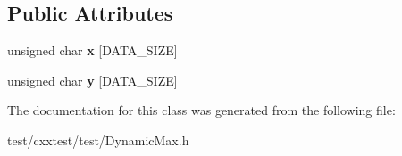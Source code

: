 \subsection*{Public Attributes}
\begin{DoxyCompactItemize}
\item 
\hypertarget{classSetUpAffectsAllTests_a405ae1454acd0d4cae2cfa45501907e9}{unsigned char {\bfseries x} \mbox{[}D\-A\-T\-A\-\_\-\-S\-I\-Z\-E\mbox{]}}\label{classSetUpAffectsAllTests_a405ae1454acd0d4cae2cfa45501907e9}

\item 
\hypertarget{classSetUpAffectsAllTests_a9ab7eb68a0cb11489c386573010b78ea}{unsigned char {\bfseries y} \mbox{[}D\-A\-T\-A\-\_\-\-S\-I\-Z\-E\mbox{]}}\label{classSetUpAffectsAllTests_a9ab7eb68a0cb11489c386573010b78ea}

\end{DoxyCompactItemize}


The documentation for this class was generated from the following file\-:\begin{DoxyCompactItemize}
\item 
test/cxxtest/test/Dynamic\-Max.\-h\end{DoxyCompactItemize}
